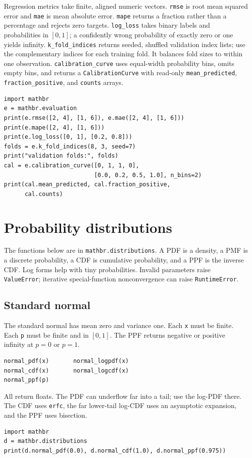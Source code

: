 \documentclass[11pt,a4paper]{article}
\begin{document}
Regression metrics take finite, aligned numeric vectors. \verb|rmse| is root mean squared error and \verb|mae| is mean absolute error. \verb|mape| returns a fraction rather than a percentage and rejects zero targets. \verb|log_loss| takes binary labels and probabilities in $[0,1]$; a confidently wrong probability of exactly zero or one yields infinity. \verb|k_fold_indices| returns seeded, shuffled validation index lists; use the complementary indices for each training fold. It balances fold sizes to within one observation. \verb|calibration_curve| uses equal-width probability bins, omits empty bins, and returns a \verb|CalibrationCurve| with read-only \verb|mean_predicted|, \verb|fraction_positive|, and \verb|counts| arrays.
\begin{verbatim}
import mathbr
e = mathbr.evaluation
print(e.rmse([2, 4], [1, 6]), e.mae([2, 4], [1, 6]))
print(e.mape([2, 4], [1, 6]))
print(e.log_loss([0, 1], [0.2, 0.8]))
folds = e.k_fold_indices(8, 3, seed=7)
print("validation folds:", folds)
cal = e.calibration_curve([0, 1, 1, 0],
                          [0.0, 0.2, 0.5, 1.0], n_bins=2)
print(cal.mean_predicted, cal.fraction_positive,
      cal.counts)
\end{verbatim}

\section{Probability distributions}
The functions below are in \verb|mathbr.distributions|. A PDF is a density, a PMF is a discrete probability, a CDF is cumulative probability, and a PPF is the inverse CDF. Log forms help with tiny probabilities. Invalid parameters raise \verb|ValueError|; iterative special-function nonconvergence can raise \verb|RuntimeError|.

\subsection{Standard normal}
The standard normal has mean zero and variance one. Each \verb|x| must be finite. Each \verb|p| must be finite and in $[0,1]$. The PPF returns negative or positive infinity at $p=0$ or $p=1$.
\begin{verbatim}
normal_pdf(x)       normal_logpdf(x)
normal_cdf(x)       normal_logcdf(x)
normal_ppf(p)
\end{verbatim}
All return floats. The PDF can underflow far into a tail; use the log-PDF there. The CDF uses \verb|erfc|, the far lower-tail log-CDF uses an asymptotic expansion, and the PPF uses bisection.
\begin{verbatim}
import mathbr
d = mathbr.distributions
print(d.normal_pdf(0.0), d.normal_cdf(1.0), d.normal_ppf(0.975))
\end{verbatim}
\end{document}

